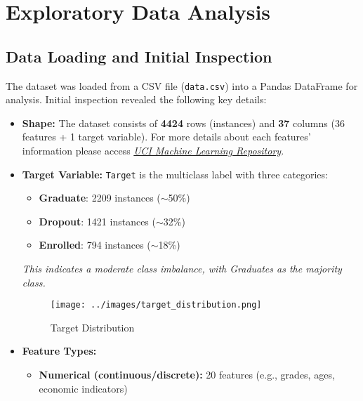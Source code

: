 \documentclass[twoside,final]{hcmut-report}
\begin{document}
\section{Exploratory Data Analysis}
\subsection{Data Loading and Initial Inspection}
The dataset was loaded from a CSV file (\texttt{data.csv}) into a Pandas DataFrame for analysis. Initial inspection revealed the following key details:

\begin{itemize}[parsep=0pt, itemsep=0pt, topsep=0pt]
  \item \textbf{Shape:} The dataset consists of \textbf{4424} rows (instances) and \textbf{37} columns (36 features + 1 target variable). For more details about each features' information please access \href{https://archive.ics.uci.edu/dataset/697/predict+students+dropout+and+academic+success}{\textit{UCI Machine Learning Repository}}.
  \item \textbf{Target Variable:} \texttt{Target} is the multiclass label with three categories:\\
        \begin{minipage}{0.48\textwidth}
          \begin{itemize}
            \item \textbf{Graduate}: 2209 instances ($\sim$50\%)
            \item \textbf{Dropout}: 1421 instances ($\sim$32\%)
            \item \textbf{Enrolled}: 794 instances ($\sim$18\%)
          \end{itemize}
          \textit{This indicates a moderate class imbalance, with Graduates as the majority class.}
        \end{minipage}
        \hfill
        \begin{minipage}{0.48\textwidth}
          \begin{figure}[H]
            \centering
            \texttt{[image: ../images/target\_distribution.png]}
            \caption{Target Distribution}
            \label{target-distribution}
          \end{figure}
        \end{minipage}
  \item \textbf{Feature Types:}
        \begin{itemize}
          \item \textbf{Numerical (continuous/discrete):} 20 features (e.g., grades, ages, economic indicators)

\end{itemize}
\end{itemize}
\end{document}
